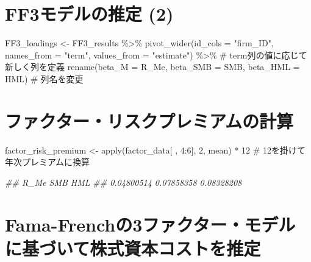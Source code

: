 \documentclass[
  letterpaper,
  DIV=11,
  numbers=noendperiod]{scrreprt}
\newenvironment{Shaded}{\begin{snugshade}}{\end{snugshade}}
\newcommand{\AttributeTok}[1]{\textcolor[rgb]{0.40,0.45,0.13}{#1}}
\newcommand{\CommentTok}[1]{\textcolor[rgb]{0.37,0.37,0.37}{#1}}
\newcommand{\DecValTok}[1]{\textcolor[rgb]{0.68,0.00,0.00}{#1}}
\newcommand{\DocumentationTok}[1]{\textcolor[rgb]{0.37,0.37,0.37}{\textit{#1}}}
\newcommand{\FunctionTok}[1]{\textcolor[rgb]{0.28,0.35,0.67}{#1}}
\newcommand{\NormalTok}[1]{\textcolor[rgb]{0.00,0.23,0.31}{#1}}
\newcommand{\OtherTok}[1]{\textcolor[rgb]{0.00,0.23,0.31}{#1}}
\newcommand{\SpecialCharTok}[1]{\textcolor[rgb]{0.37,0.37,0.37}{#1}}
\newcommand{\StringTok}[1]{\textcolor[rgb]{0.13,0.47,0.30}{#1}}
\begin{document}
\section{FF3モデルの推定
(2)}\label{ff3ux30e2ux30c7ux30ebux306eux63a8ux5b9a-2}

\begin{Shaded}
\begin{Highlighting}[]
\NormalTok{FF3\_loadings }\OtherTok{\textless{}{-}}\NormalTok{ FF3\_results }\SpecialCharTok{\%\textgreater{}\%} 
  \FunctionTok{pivot\_wider}\NormalTok{(}\AttributeTok{id\_cols =} \StringTok{"firm\_ID"}\NormalTok{, }\AttributeTok{names\_from =} \StringTok{"term"}\NormalTok{, }\AttributeTok{values\_from =} \StringTok{"estimate"}\NormalTok{) }\SpecialCharTok{\%\textgreater{}\%} \CommentTok{\# term列の値に応じて新しく列を定義}
  \FunctionTok{rename}\NormalTok{(}\AttributeTok{beta\_M =}\NormalTok{ R\_Me, }\AttributeTok{beta\_SMB =}\NormalTok{ SMB, }\AttributeTok{beta\_HML =}\NormalTok{ HML) }\CommentTok{\# 列名を変更}
\end{Highlighting}
\end{Shaded}

\section{ファクター・リスクプレミアムの計算}\label{ux30d5ux30a1ux30afux30bfux30fcux30eaux30b9ux30afux30d7ux30ecux30dfux30a2ux30e0ux306eux8a08ux7b97}

\begin{Shaded}
\begin{Highlighting}[]
\NormalTok{factor\_risk\_premium }\OtherTok{\textless{}{-}} \FunctionTok{apply}\NormalTok{(factor\_data[ , }\DecValTok{4}\SpecialCharTok{:}\DecValTok{6}\NormalTok{], }\DecValTok{2}\NormalTok{, mean) }\SpecialCharTok{*} \DecValTok{12} \CommentTok{\# 12を掛けて年次プレミアムに換算}

\DocumentationTok{\#\#       R\_Me        SMB        HML }
\DocumentationTok{\#\# 0.04800514 0.07858358 0.08328208 }
\end{Highlighting}
\end{Shaded}

\section{Fama-Frenchの3ファクター・モデルに基づいて株式資本コストを推定}\label{fama-frenchux306e3ux30d5ux30a1ux30afux30bfux30fcux30e2ux30c7ux30ebux306bux57faux3065ux3044ux3066ux682aux5f0fux8cc7ux672cux30b3ux30b9ux30c8ux3092ux63a8ux5b9a}
\end{document}
